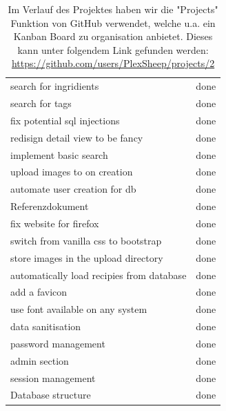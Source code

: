 \documentclass{article}
\begin{document}
\begin{table}[hbt!]
\begin{tabular}{@{}|l|l|@{}}
search for ingridients                                                  & done      \\ 
search for tags                                                         & done      \\ 
fix potential sql injections                                            & done      \\ 
redisign detail view to be fancy                                        & done      \\ 
implement basic search                                                  & done      \\ 
upload images to on creation                                            & done      \\ 
automate user creation for db                                           & done      \\ 
Referenzdokument                                                        & done      \\ 
fix website for firefox                                                 & done      \\ 
switch from vanilla css to bootstrap                                    & done      \\ 
store images in the upload directory                                    & done      \\ 
automatically load recipies from database                               & done      \\ 
add a favicon                                                           & done      \\ 
use font available on any system                                        & done      \\ 
data sanitisation                                                       & done      \\ 
password management                                                     & done      \\ 
admin section                                                           & done      \\ 
session management                                                      & done      \\ 
Database structure                                                      & done      \\ 
\hline
\end{tabular}
\caption{
Im Verlauf des Projektes haben wir die "Projects" Funktion von GitHub verwendet, welche u.a. ein Kanban Board zu organisation anbietet.
Dieses kann unter folgendem Link gefunden werden:  
\url{https://github.com/users/PlexSheep/projects/2}
}
\end{table}
\end{document}
